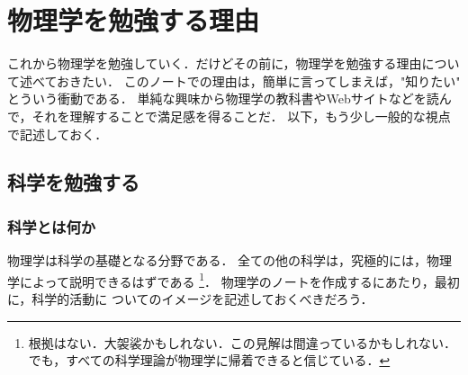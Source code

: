     \section{物理学を勉強する理由}
        \begin{mycomment}
            これから物理学を勉強していく．だけどその前に，物理学を勉強する理由について述べておきたい．
            このノートでの理由は，簡単に言ってしまえば，"知りたい" とういう衝動である．
            単純な興味から物理学の教科書やWebサイトなどを読んで，それを理解することで満足感を得ることだ．
            以下，もう少し一般的な視点で記述しておく．
        \end{mycomment}

        \subsection{科学を勉強する}
        \subsubsection{科学とは何か}
            物理学は科学の基礎となる分野である．
            全ての他の科学は，究極的には，物理学によって説明できるはずである
                \footnote{
                    根拠はない．大袈裟かもしれない．この見解は間違っているかもしれない．
                    でも，すべての科学理論が物理学に帰着できると信じている．
                }．
            物理学のノートを作成するにあたり，最初に，科学的活動に
            ついてのイメージを記述しておくべきだろう．

